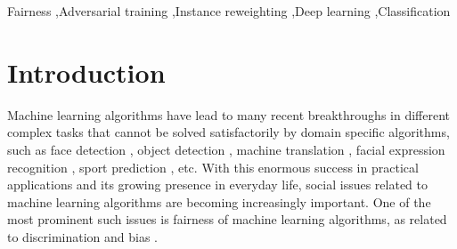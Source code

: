 \documentclass[preprint,12pt]{elsarticle}
\begin{document}
\begin{frontmatter}

\begin{keyword}
Fairness \sep Adversarial training \sep Instance reweighting  \sep Deep learning \sep Classification
\end{keyword}

\end{frontmatter}


\section{Introduction}
\label{Sec:Introduction}
Machine learning algorithms have lead to many recent breakthroughs in different complex tasks that cannot be solved satisfactorily by domain specific algorithms, such as face detection \cite{kumar2019face}, object detection \cite{voulodimos2018deep}, machine translation \cite{singh2017machine}, facial expression recognition
\cite{domadiya2019review}, sport prediction \cite{bunker2019machine}, etc. With this enormous success in practical applications and its growing presence in everyday life, social issues related to machine learning algorithms are becoming increasingly important. One of the most prominent such issues is fairness of machine learning algorithms, as related to discrimination and bias \cite{hajian2016algorithmic}.
\end{document}
